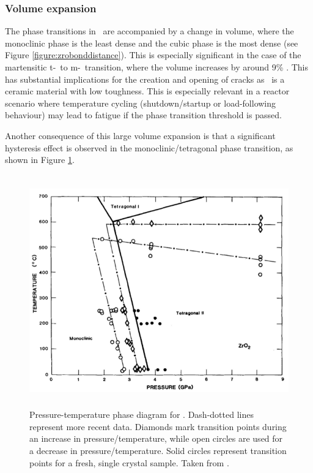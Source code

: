 \subsubsection*{Volume expansion}

The phase transitions in \zirconia\ are accompanied by a change in volume, where the monoclinic phase is the least dense and the cubic phase is the most dense (see Figure \ref{figure:zrobonddistance}). This is especially significant in the case of the martensitic t-\zirconia\ to m-\zirconia\ transition, where the volume increases by around 9\% \cite{Gupta1977}. This has substantial implications for the creation and opening of cracks as \zirconia\ is a ceramic material with low toughness. This is especially relevant in a reactor scenario where temperature cycling (shutdown/startup or load-following behaviour) may lead to fatigue if the phase transition threshold is passed.

Another consequence of this large volume expansion is that a significant hysteresis effect is observed in the monoclinic/tetragonal phase transition, as shown in Figure \ref{fig:phasediagram}. 

\begin{figure}[htp]
  \centering
      \includegraphics[height=10cm]{images/zirconiaphasediagram.png}
  \caption{Pressure-temperature phase diagram for \zirconia . Dash-dotted lines represent more recent data. Diamonds mark transition points during an increase in pressure/temperature, while open circles are used for a decrease in pressure/temperature. Solid circles represent transition points for a fresh, single crystal sample. Taken from \cite{gando2011partial}. \label{fig:phasediagram}}
\end{figure}

